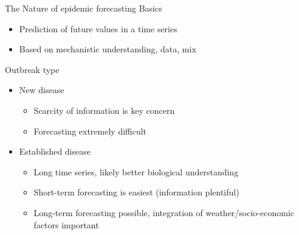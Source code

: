 \documentclass[11pt,compress,aspectratio=1610]{beamer}
\begin{document}
\begin{frame}{The Nature of epidemic forecasting}
Basics
\begin{itemize}
	\item Prediction of future values in a time series
	\item Based on mechanistic understanding, data, mix
\end{itemize}
\vspace{\baselineskip}
Outbreak type
\begin{itemize}
	\item New disease
	\begin{itemize}
		\item Scarcity of information is key concern
		\item Forecasting extremely difficult
	\end{itemize}
	\item Established disease
	\begin{itemize}
		\item Long time series, likely better biological understanding
		\item Short-term forecasting is easiest (information plentiful)
		\item Long-term forecasting possible, integration of weather/socio-economic factors important
	\end{itemize}
\end{itemize}
\end{frame}


\end{document}
